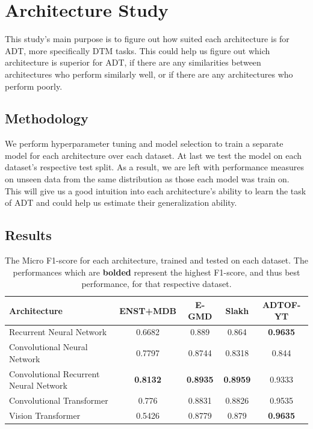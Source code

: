 \chapter{Architecture Study}

This study's main purpose is to figure out how suited each architecture is for \acrfull{ADT}, more specifically \acrfull{DTM} tasks. This could help us figure out which architecture is superior for \gls{ADT}, if there are any similarities between architectures who perform similarly well, or if there are any architectures who perform poorly.

\section{Methodology}

We perform hyperparameter tuning and model selection to train a separate model for each architecture over each dataset. At last we test the model on each dataset's respective test split. As a result, we are left with performance measures on unseen data from the same distribution as those each model was train on. This will give us a good intuition into each architecture's ability to learn the task of \gls{ADT} and could help us estimate their generalization ability.

\section{Results}	

\begin{table}[H]
    \centering
    \hspace*{-0.6cm}
    \begin{tabular}{l|cccc}
        Architecture & ENST+MDB & E-GMD & Slakh & ADTOF-YT       \\
        \hline
        Recurrent Neural Network	& 0.6682 &	0.889 &	0.864 &	\textbf{0.9635} \\
        Convolutional Neural Network	& 0.7797 &	0.8744 &	0.8318 &	0.844 \\
        Convolutional Recurrent Neural Network	& \textbf{0.8132} &	\textbf{0.8935} &	\textbf{0.8959} &	0.9333 \\
        Convolutional Transformer	& 0.776 &	0.8831 &	0.8826 &	0.9535 \\
        Vision Transformer	& 0.5426 &	0.8779 &	0.879 &	\textbf{0.9635} \\
        
    \end{tabular}
    \caption{The Micro F1-score for each architecture, trained and tested on each dataset. The performances which are \textbf{bolded} represent the highest F1-score, and thus best performance, for that respective dataset.}
    \label{ArchitectureResultsTable}
\end{table}


